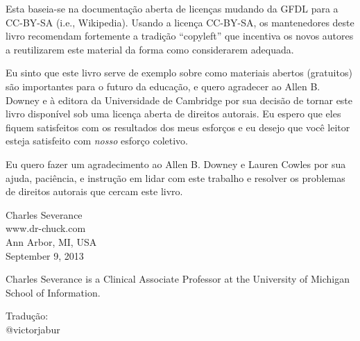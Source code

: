 Esta baseia-se na documentação aberta de licenças mudando da GFDL
para a CC-BY-SA (i.e., Wikipedia).
Usando a licença CC-BY-SA, os mantenedores deste livro recomendam
fortemente a tradição ``copyleft'' que incentiva os novos autores
a reutilizarem este material da forma como considerarem adequada.

Eu sinto que este livro serve de exemplo sobre como materiais
abertos (gratuitos) são importantes para o futuro da educação,
e quero agradecer ao Allen B. Downey e à editora da Universidade de 
Cambridge por sua decisão de tornar este livro disponível sob uma licença
aberta de direitos autorais. Eu espero que eles fiquem satisfeitos com
os resultados dos meus esforços e eu desejo que você leitor esteja satisfeito
com \emph{nosso} esforço coletivo.

Eu quero fazer um agradecimento ao Allen B. Downey e Lauren Cowles por sua ajuda,
paciência, e instrução em lidar com este trabalho e resolver os problemas de 
direitos autorais que cercam este livro.

Charles Severance\\
www.dr-chuck.com\\
Ann Arbor, MI, USA\\
September 9, 2013

Charles Severance is a 
Clinical Associate Professor 
at the University of Michigan School of Information.

Tradução:\\
@victorjabur

\clearemptydoublepage

\begin{latexonly}

\tableofcontents

\clearemptydoublepage

\end{latexonly}

\mainmatter

